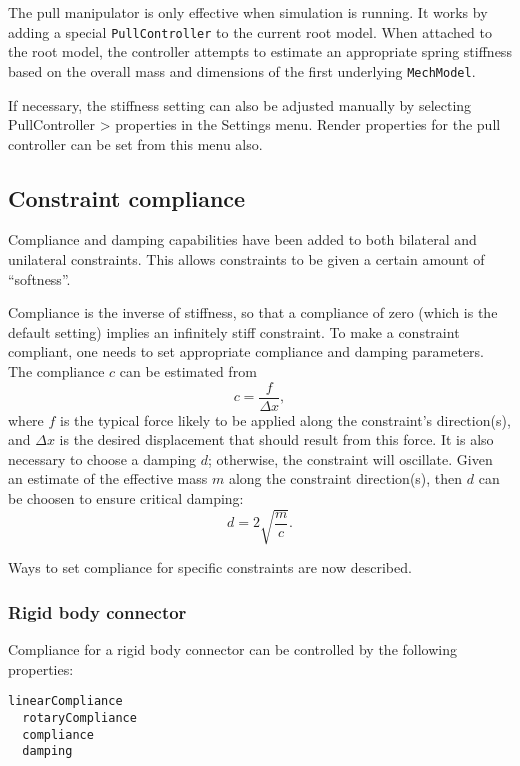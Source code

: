 \documentclass{article}
\begin{document}
The pull manipulator is only effective when simulation is running.  It
works by adding a special {\tt PullController} to the current root
model. When attached to the root model, the controller attempts to
estimate an appropriate spring stiffness based on the overall mass and
dimensions of the first underlying {\tt MechModel}.

If necessary, the stiffness setting can also be adjusted manually by
selecting {\sf PullController > properties} in the {\sf Settings}
menu.  Render properties for the pull controller can be set from this
menu also.

\subsection*{Constraint compliance}

Compliance and damping capabilities have been added to both bilateral
and unilateral constraints. This allows constraints to be
given a certain amount of ``softness''.

Compliance is the inverse of stiffness, so that a compliance of zero
(which is the default setting) implies an infinitely stiff constraint.
To make a constraint compliant, one needs to set appropriate
compliance and damping parameters. The compliance $c$ can
be estimated from
\[
c = \frac{f}{\Delta x},
\]
where $f$ is the typical force likely to be applied along the
constraint's direction(s), and $\Delta x$ is the desired displacement
that should result from this force. It is also necessary to choose a
damping $d$; otherwise, the constraint will oscillate. Given an
estimate of the effective mass $m$ along the constraint direction(s),
then $d$ can be choosen to ensure critical damping:
\[
d = 2 \sqrt{\frac{m}{c}}.
\]

Ways to set compliance for specific constraints are now described.

\subsubsection*{Rigid body connector}

Compliance for a rigid body connector can be controlled by the
following properties:

\begin{lstlisting}[]
  linearCompliance
  rotaryCompliance
  compliance
  damping
\end{lstlisting}
\end{document}
